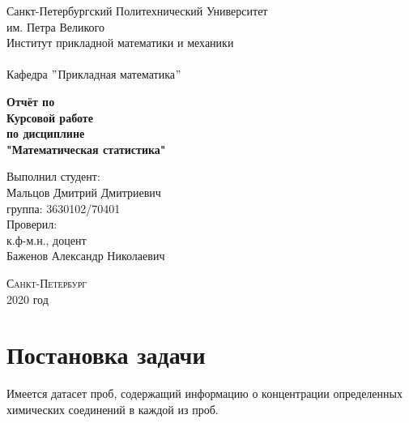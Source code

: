 \documentclass[a4]{article}
\begin{document}
	\def\contentsname{\LARGE{Содержание}}
	\thispagestyle{empty}
	\begin{center} 
		\vspace{2cm} 
		{\Large \sc Санкт-Петербургский Политехнический Университет}\\
		\vspace{2mm}
		{\Large\sc им. Петра Великого}\\
		\vspace{1cm}
		{\large \sc Институт прикладной математики и механики\\ 
			\vspace{0.5mm}
			\textsc{}}\\ 
		\vspace{0.5mm}
		{\large\sc Кафедра $"$Прикладная математика$"$}\\
		\vspace{15mm}
		
		
		{\sc \textbf{Отчёт по\\
			Курсовой работе\\
			по дисциплине\\
			"Математическая статистика"}
			\vspace{6mm}
			
		}
		\vspace*{2mm}
		
		
		\begin{flushleft}
			\vspace{4cm}
			\sc Выполнил студент:\\
			\sc Мальцов Дмитрий Дмитриевич\\
			\sc группа: 3630102/70401\\
			\vspace{1cm}
			\sc Проверил:\\
			\sc к.ф-м.н., доцент\\
			\sc Баженов Александр Николаевич
			\vspace{20mm}
		\end{flushleft}
	\end{center} 
	\begin{center}
		\vfill {\large\textsc{Санкт-Петербург}}\\ 
		2020 год
	\end{center}
	
	\newpage
	\pagestyle{plain}
	

	\newpage
	\tableofcontents{}
	\newpage
	\listoffigures
	\newpage
	
	
	\section{Постановка задачи}
	Имеется датасет проб, содержащий информацию о концентрации определенных химических соединений в каждой из проб.\\
	
\end{document}
